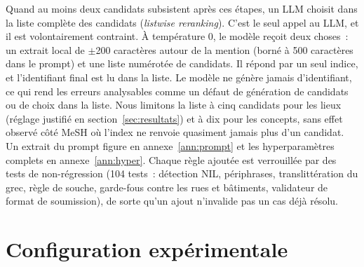 \documentclass[10pt,twoside]{article}
\begin{document}
Quand au moins deux candidats subsistent après ces étapes, un LLM choisit dans la liste complète
des candidats (\emph{listwise reranking}). C'est le seul appel au LLM, et il est volontairement
contraint. À température 0, le
modèle reçoit deux choses~: un extrait local de $\pm$200 caractères autour de la mention (borné à
500 caractères dans le prompt) et une liste numérotée de candidats. Il répond par un seul indice, et
l'identifiant final est lu dans la liste. Le modèle ne génère jamais d'identifiant, ce qui
rend les erreurs analysables comme un défaut de génération de candidats ou de choix dans la liste.
Nous limitons la liste à cinq candidats pour les lieux (réglage justifié en
section~\ref{sec:resultats}) et à dix pour les concepts, sans effet observé côté MeSH où l'index ne
renvoie quasiment jamais plus d'un candidat. Un extrait du prompt figure en annexe~\ref{ann:prompt}
et les hyperparamètres complets en annexe~\ref{ann:hyper}. Chaque règle ajoutée est verrouillée par
des tests de non-régression (104 tests~: détection NIL, périphrases, translittération du grec,
règle de souche, garde-fous contre les rues et bâtiments, validateur de format de soumission),
de sorte qu'un ajout n'invalide pas un cas déjà résolu.

\section{Configuration expérimentale}
\label{sec:config}
\end{document}
